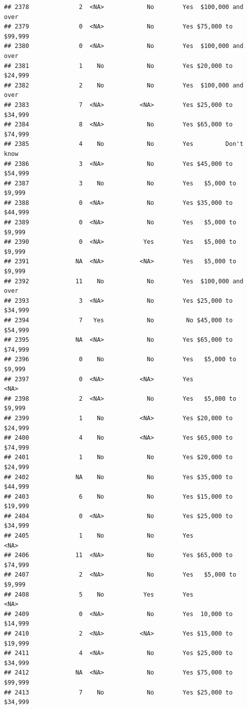 \documentclass[man]{apa6}
\begin{document}
\begin{verbatim}
## 2378              2  <NA>            No        Yes  $100,000 and over
## 2379              0  <NA>            No        Yes $75,000 to $99,999
## 2380              0  <NA>            No        Yes  $100,000 and over
## 2381              1    No            No        Yes $20,000 to $24,999
## 2382              2    No            No        Yes  $100,000 and over
## 2383              7  <NA>          <NA>        Yes $25,000 to $34,999
## 2384              8  <NA>            No        Yes $65,000 to $74,999
## 2385              4    No            No        Yes         Don't know
## 2386              3  <NA>            No        Yes $45,000 to $54,999
## 2387              3    No            No        Yes   $5,000 to $9,999
## 2388              0  <NA>            No        Yes $35,000 to $44,999
## 2389              0  <NA>            No        Yes   $5,000 to $9,999
## 2390              0  <NA>           Yes        Yes   $5,000 to $9,999
## 2391             NA  <NA>          <NA>        Yes   $5,000 to $9,999
## 2392             11    No            No        Yes  $100,000 and over
## 2393              3  <NA>            No        Yes $25,000 to $34,999
## 2394              7   Yes            No         No $45,000 to $54,999
## 2395             NA  <NA>            No        Yes $65,000 to $74,999
## 2396              0    No            No        Yes   $5,000 to $9,999
## 2397              0  <NA>          <NA>        Yes               <NA>
## 2398              2  <NA>            No        Yes   $5,000 to $9,999
## 2399              1    No          <NA>        Yes $20,000 to $24,999
## 2400              4    No          <NA>        Yes $65,000 to $74,999
## 2401              1    No            No        Yes $20,000 to $24,999
## 2402             NA    No            No        Yes $35,000 to $44,999
## 2403              6    No            No        Yes $15,000 to $19,999
## 2404              0  <NA>            No        Yes $25,000 to $34,999
## 2405              1    No            No        Yes               <NA>
## 2406             11  <NA>            No        Yes $65,000 to $74,999
## 2407              2  <NA>            No        Yes   $5,000 to $9,999
## 2408              5    No           Yes        Yes               <NA>
## 2409              0  <NA>            No        Yes  10,000 to $14,999
## 2410              2  <NA>          <NA>        Yes $15,000 to $19,999
## 2411              4  <NA>            No        Yes $25,000 to $34,999
## 2412             NA  <NA>            No        Yes $75,000 to $99,999
## 2413              7    No            No        Yes $25,000 to $34,999

\end{verbatim}
\end{document}
